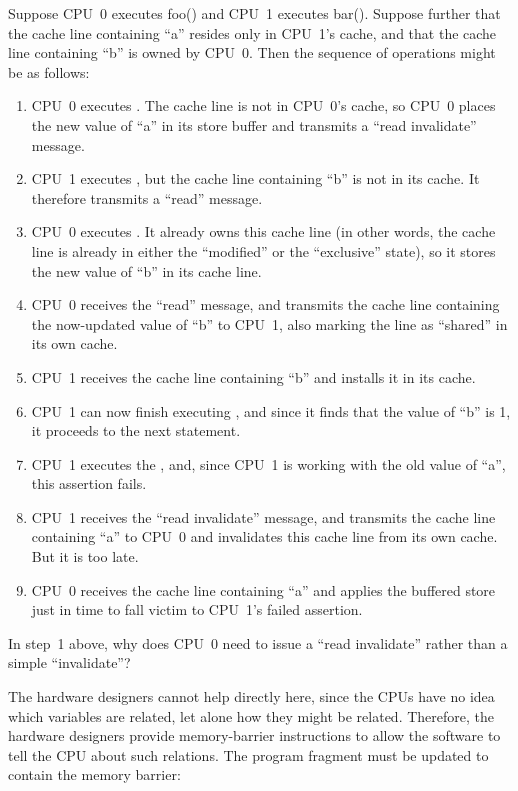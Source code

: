 Suppose CPU~0 executes foo() and CPU~1 executes bar().
Suppose further that the cache line containing ``a'' resides only in CPU~1's
cache, and that the cache line containing ``b'' is owned by CPU~0.
Then the sequence of operations might be as follows:
\begin{enumerate}
\item	CPU~0 executes .  The cache line is not in
	CPU~0's cache, so CPU~0 places the new value of ``a'' in its
	store buffer and transmits a ``read invalidate'' message.
\item	CPU~1 executes , but the cache line
	containing ``b'' is not in its cache.
	It therefore transmits a ``read'' message.
\item	CPU~0 executes .
	It already owns this cache line (in other words, the cache line
	is already in either the ``modified'' or the ``exclusive'' state),
	so it stores the new value of ``b'' in its cache line.
\item	CPU~0 receives the ``read'' message, and transmits the
	cache line containing the now-updated value of ``b''
	to CPU~1, also marking the line as ``shared'' in its own cache.
\item	CPU~1 receives the cache line containing ``b'' and installs
	it in its cache.
\item	CPU~1 can now finish executing ,
	and since it finds that the value of ``b'' is 1, it proceeds
	to the next statement.
\item	CPU~1 executes the , and, since CPU~1 is
	working with the old value of ``a'', this assertion fails.
\item	CPU~1 receives the ``read invalidate'' message, and
	transmits the cache line containing ``a'' to CPU~0 and
	invalidates this cache line from its own cache.
	But it is too late.
\item	CPU~0 receives the cache line containing ``a'' and applies
	the buffered store just in time to fall victim to CPU~1's
	failed assertion.
\end{enumerate}

\QuickQuiz{}
	In step~1 above, why does CPU~0 need to issue a ``read invalidate''
	rather than a simple ``invalidate''?
 \QuickQuizEnd

The hardware designers cannot help directly here, since the CPUs have
no idea which variables are related, let alone how they might be related.
Therefore, the hardware designers provide memory-barrier instructions
to allow the software to tell the CPU about such relations.
The program fragment must be updated to contain the memory barrier:


